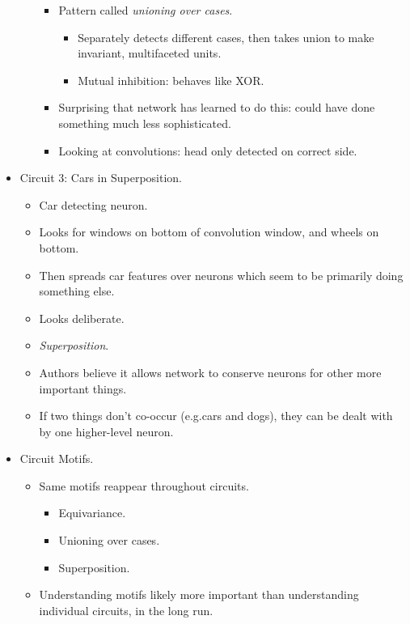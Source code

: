 \begin{itemize}
\begin{itemize}
\begin{itemize}
            \item Pattern called \emph{unioning over cases}.
            \begin{itemize}
                \item Separately detects different cases, then takes union to make invariant, multifaceted units.
                \item Mutual inhibition: behaves like XOR.
            \end{itemize}
            \item Surprising that network has learned to do this: could have done something much less sophisticated.
            \item Looking at convolutions: head only detected on correct side.
        \end{itemize}
    \end{itemize}
    \item Circuit 3: Cars in Superposition.
    \begin{itemize}
        \item Car detecting neuron.
        \item Looks for windows on bottom of convolution window, and wheels on bottom.
        \item Then spreads car features over neurons which seem to be primarily doing something else.
        \item Looks deliberate.
        \item \emph{Superposition}.
        \item Authors believe it allows network to conserve neurons for other more important things.
        \item If two things don't co-occur (e.g.\@ cars and dogs), they can be dealt with by one higher-level neuron.
    \end{itemize}
    \item Circuit Motifs.
    \begin{itemize}
        \item Same motifs reappear throughout circuits.
        \begin{itemize}
            \item Equivariance.
            \item Unioning over cases.
            \item Superposition.
        \end{itemize}
        \item Understanding motifs likely more important than understanding individual circuits, in the long run.
    \end{itemize}
\end{itemize}


